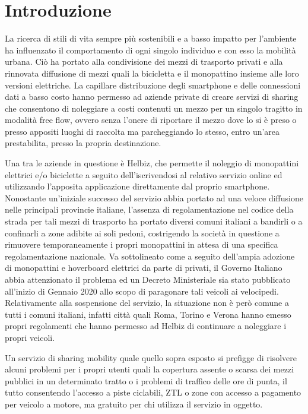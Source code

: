 \chapter{Introduzione}

La ricerca di stili di vita sempre più sostenibili e a basso impatto per
l'ambiente ha influenzato il comportamento di ogni singolo individuo e con esso
la mobilità urbana.
Ciò ha portato alla condivisione dei mezzi di trasporto privati e alla rinnovata
diffusione di mezzi quali la bicicletta e il monopattino insieme alle loro versioni
elettriche.
La capillare distribuzione degli smartphone e delle connessioni dati a basso costo
hanno permesso ad aziende private di creare servizi di sharing che consentono di 
noleggiare a costi contenuti un mezzo per un singolo tragitto in modalità free flow, ovvero
senza l'onere di riportare il mezzo dove lo si è preso o presso appositi luoghi
di raccolta ma parcheggiando lo stesso, entro un'area prestabilita, presso la
propria destinazione.

Una tra le aziende in questione è Helbiz, che permette il noleggio di monopattini
elettrici e/o biciclette a seguito dell'iscrivendosi al relativo servizio online ed
utilizzando l'apposita applicazione direttamente dal proprio smartphone. Nonostante un'iniziale
successo del servizio abbia portato ad una veloce diffusione nelle principali provincie
italiane, l'assenza di regolamentazione nel codice della strada per tali mezzi di
trasporto ha portato diversi comuni italiani a bandirli o a confinarli a zone adibite
ai soli pedoni, costrigendo la società in questione a rimuovere temporaneamente i
propri monopattini in attesa di una specifica regolamentazione nazionale.
Va sottolineato come a seguito dell'ampia adozione di monopattini e hoverboard
elettrici da parte di privati, il Governo Italiano abbia attenzionato il problema
ed un Decreto Ministeriale sia stato pubblicato all'inizio di Gennaio 2020 allo
scopo di paragonare tali veicoli ai velocipedi.
Relativamente alla sospensione del servizio, la situazione non
è però comune a tutti i comuni italiani, infatti città quali Roma, Torino e Verona
hanno emesso propri regolamenti che hanno permesso ad Helbiz di continuare a
noleggiare i propri veicoli.

Un servizio di sharing mobility quale quello sopra esposto si prefigge di risolvere
alcuni problemi per i propri utenti quali la copertura assente o scarsa dei mezzi
pubblici in un determinato tratto o i problemi di traffico delle ore di punta, il tutto
consentendo l'accesso a piste ciclabili, ZTL o zone con accesso a pagamento per veicolo
a motore, ma gratuito per chi utilizza il servizio in oggetto.

